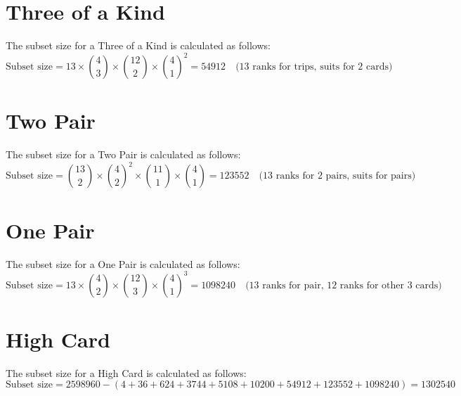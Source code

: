 \documentclass{article}
\begin{document}
\section*{Three of a Kind}
The subset size for a Three of a Kind is calculated as follows:
\[
\text{Subset size} = 13 \times \binom{4}{3} \times \binom{12}{2} \times \binom{4}{1}^2 = 54912 \quad \text{(13 ranks for trips, suits for 2 cards)}
\]


\section*{Two Pair}
The subset size for a Two Pair is calculated as follows:
\[
\text{Subset size} = \binom{13}{2} \times \binom{4}{2}^2 \times \binom{11}{1} \times \binom{4}{1} = 123552 \quad \text{(13 ranks for 2 pairs, suits for pairs)}
\]


\section*{One Pair}
The subset size for a One Pair is calculated as follows:
\[
\text{Subset size} = 13 \times \binom{4}{2} \times \binom{12}{3} \times \binom{4}{1}^3 = 1098240 \quad \text{(13 ranks for pair, 12 ranks for other 3 cards)}
\]


\section*{High Card}
The subset size for a High Card is calculated as follows:
\[
\text{Subset size} = 2598960 - \left(4 + 36 + 624 + 3744 + 5108 + 10200 + 54912 + 123552 + 1098240\right) = 1302540
\]
\end{document}
